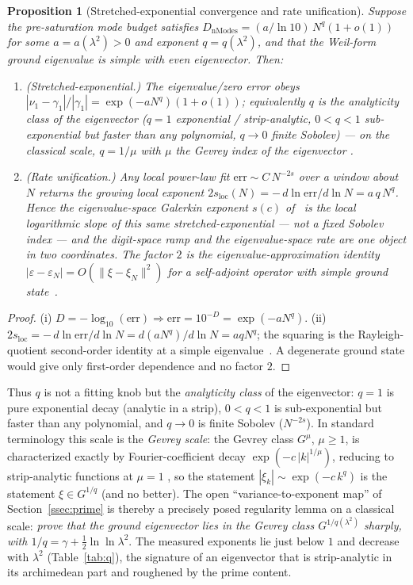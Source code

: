 \documentclass[11pt,a4paper]{article}
\newtheorem{proposition}{Proposition}
\begin{document}
\begin{proposition}[Stretched-exponential convergence and rate unification]\label{prop:stretched}
Suppose the pre-saturation mode budget satisfies $D_{\mathrm{nModes}}=(a/\ln10)\,
N^{q}(1+o(1))$ for some $a=a(\lambda^2)>0$ and exponent $q=q(\lambda^2)$, and that
the Weil-form ground eigenvalue is simple with even eigenvector. Then:
\begin{enumerate}
\item[(i)] \emph{(Stretched-exponential.)} The eigenvalue/zero error obeys
  $|\nu_1-\gamma_1|/|\gamma_1|=\exp(-aN^{q})(1+o(1))$; equivalently $q$ is the
  analyticity class of the eigenvector ($q=1$ exponential / strip-analytic,
  $0<q<1$ sub-exponential but faster than any polynomial, $q\to0$ finite Sobolev)
  --- on the classical scale, $q=1/\mu$ with $\mu$ the Gevrey index of the
  eigenvector \cite{Rodino1993}.
\item[(ii)] \emph{(Rate unification.)} Any local power-law fit
  $\mathrm{err}\sim C\,N^{-2s}$ over a window about $N$ returns the \emph{growing}
  local exponent $2s_{\mathrm{loc}}(N)=-\,d\ln\mathrm{err}/d\ln N=a\,q\,N^{q}$.
  Hence the eigenvalue-space Galerkin exponent $s(c)$ of~\cite{Groskin2026} is the
  local logarithmic slope of this same stretched-exponential --- not a fixed
  Sobolev index --- and the digit-space ramp and the eigenvalue-space rate are one
  object in two coordinates. The factor $2$ is the eigenvalue-approximation
  identity $|\varepsilon-\varepsilon_N|=O(\|\xi-\xi_N\|^2)$ for a self-adjoint
  operator with simple ground state~\cite{BabuskaOsborn1991}.
\end{enumerate}
\end{proposition}
\begin{proof}
(i) $D=-\log_{10}(\mathrm{err})\Rightarrow\mathrm{err}=10^{-D}=\exp(-aN^q)$.
(ii) $2s_{\mathrm{loc}}=-\,d\ln\mathrm{err}/d\ln N=d(aN^q)/d\ln N=aqN^q$; the
squaring is the Rayleigh-quotient second-order identity at a simple
eigenvalue~\cite{BabuskaOsborn1991}. A degenerate ground state would give only
first-order dependence and no factor $2$.
\end{proof}

Thus $q$ is not a fitting knob but the \emph{analyticity class} of the
eigenvector: $q=1$ is pure exponential decay (analytic in a strip), $0<q<1$ is
sub-exponential but faster than any polynomial, and $q\to0$ is finite Sobolev
($N^{-2s}$). In standard terminology this scale is the \emph{Gevrey scale}: the
Gevrey class $G^{\mu}$, $\mu\ge1$, is characterized exactly by Fourier-coefficient
decay $\exp(-c\,|k|^{1/\mu})$, reducing to strip-analytic functions at $\mu=1$
\cite{Rodino1993}, so the statement $|\xi_k|\sim\exp(-c\,k^{q})$ is the
statement $\xi\in G^{1/q}$ (and no better). The open ``variance-to-exponent
map'' of Section~\ref{ssec:prime} is thereby a precisely posed regularity
lemma on a classical scale: \emph{prove that the ground eigenvector lies in the
Gevrey class $G^{1/q(\lambda^2)}$ sharply, with
$1/q=\gamma+\tfrac12\ln\ln\lambda^2$}. The measured exponents lie just below $1$
and decrease with
$\lambda^2$ (Table~\ref{tab:q}), the signature of an eigenvector that is
strip-analytic in its archimedean part and roughened by the prime content.
\end{document}
